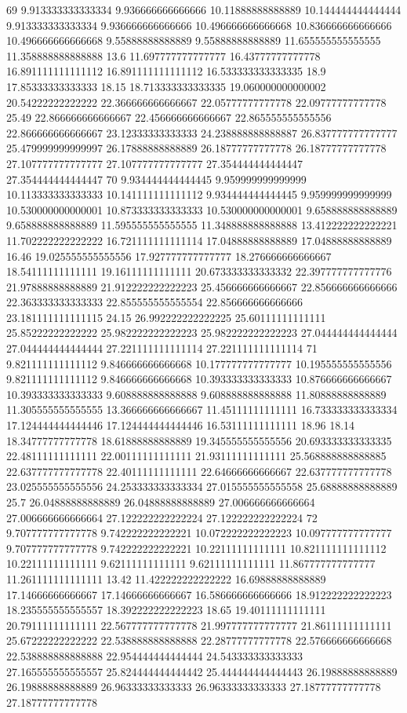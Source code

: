 69 9.913333333333334 9.936666666666666 10.11888888888889 10.144444444444444 9.913333333333334 9.936666666666666 10.496666666666668 10.836666666666666 10.496666666666668 9.55888888888889 9.55888888888889 11.655555555555555 11.358888888888888 13.6 11.697777777777777 16.43777777777778 16.891111111111112 16.891111111111112 16.533333333333335 18.9 17.85333333333333 18.15 18.713333333333335 19.060000000000002 20.54222222222222 22.366666666666667 22.05777777777778 22.09777777777778 25.49 22.866666666666667 22.456666666666667 22.865555555555556 22.866666666666667 23.12333333333333 24.238888888888887 26.837777777777777 25.479999999999997 26.17888888888889 26.18777777777778 26.18777777777778 27.107777777777777 27.107777777777777 27.354444444444447 27.354444444444447
70 9.934444444444445 9.959999999999999 10.113333333333333 10.141111111111112 9.934444444444445 9.959999999999999 10.530000000000001 10.873333333333333 10.530000000000001 9.658888888888889 9.658888888888889 11.595555555555555 11.348888888888888 13.412222222222221 11.702222222222222 16.721111111111114 17.04888888888889 17.04888888888889 16.46 19.025555555555556 17.927777777777777 18.276666666666667 18.54111111111111 19.16111111111111 20.673333333333332 22.397777777777776 21.97888888888889 21.912222222222223 25.456666666666667 22.856666666666666 22.363333333333333 22.855555555555554 22.856666666666666 23.181111111111115 24.15 26.992222222222225 25.60111111111111 25.85222222222222 25.982222222222223 25.982222222222223 27.044444444444444 27.044444444444444 27.221111111111114 27.221111111111114
71 9.821111111111112 9.846666666666668 10.177777777777777 10.195555555555556 9.821111111111112 9.846666666666668 10.393333333333333 10.876666666666667 10.393333333333333 9.608888888888888 9.608888888888888 11.80888888888889 11.305555555555555 13.366666666666667 11.45111111111111 16.733333333333334 17.124444444444446 17.124444444444446 16.53111111111111 18.96 18.14 18.34777777777778 18.61888888888889 19.345555555555556 20.693333333333335 22.48111111111111 22.00111111111111 21.93111111111111 25.568888888888885 22.637777777777778 22.40111111111111 22.64666666666667 22.637777777777778 23.025555555555556 24.253333333333334 27.015555555555558 25.68888888888889 25.7 26.04888888888889 26.04888888888889 27.006666666666664 27.006666666666664 27.122222222222224 27.122222222222224
72 9.707777777777778 9.742222222222221 10.072222222222223 10.097777777777777 9.707777777777778 9.742222222222221 10.22111111111111 10.821111111111112 10.22111111111111 9.62111111111111 9.62111111111111 11.867777777777777 11.261111111111111 13.42 11.422222222222222 16.69888888888889 17.14666666666667 17.14666666666667 16.586666666666666 18.912222222222223 18.235555555555557 18.392222222222223 18.65 19.40111111111111 20.79111111111111 22.567777777777778 21.997777777777777 21.86111111111111 25.67222222222222 22.538888888888888 22.28777777777778 22.576666666666668 22.538888888888888 22.954444444444444 24.543333333333333 27.165555555555557 25.824444444444442 25.444444444444443 26.19888888888889 26.19888888888889 26.96333333333333 26.96333333333333 27.18777777777778 27.18777777777778
